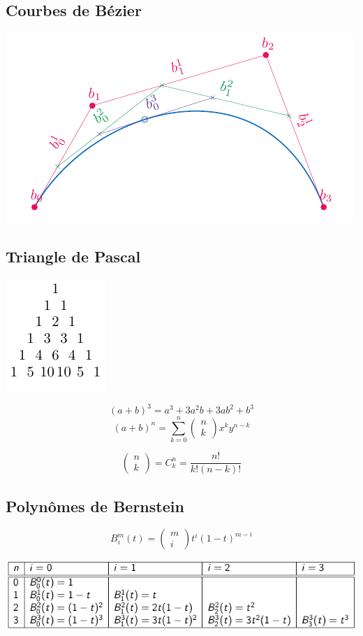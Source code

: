\documentclass[]{article}
\begin{document}
\begin{multicols}{3}
\section{Courbes de Bézier}
\begin{center}
\includegraphics[width=0.6\columnwidth,page=1]{drwg_0.pdf}
\end{center}
\subsection{Triangle de Pascal}
\begin{center}
\includegraphics[scale=1,page=1]{drwg_1.pdf}
\end{center}
$$(a+b)^3=a^3+3a^2b+3ab^2+b^3$$
$$(a+b)^n=\sum_{k=0}^{n}\begin{pmatrix}
n\\k
\end{pmatrix}x^ky^{n-k}$$

$$\begin{pmatrix}
n\\ k
\end{pmatrix}=C^{n}_{k}=\frac{n!}{k!(n-k)!}$$
\subsection{Polynômes de Bernstein}
$$B_{i}^{m}(t)=\begin{pmatrix}m\\i\end{pmatrix}t^{i}(1-t)^{m-i}$$
\begin{center}
\includegraphics[width=\columnwidth]{img_21.pdf}
\end{center}
\end{multicols}
\end{document}
